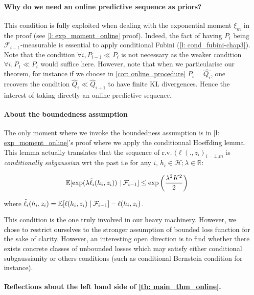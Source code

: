 \paragraph{Why do we need an online predictive sequence as priors? }

This condition is fully exploited when dealing with the exponential moment $\xi_m$ in the proof (see \cref{l: exp_moment_online} proof). Indeed, the fact of having $P_i$ being $\mathcal{F}_{i-1}$-measurable is essential to apply conditional Fubini (\cref{l: cond_fubini-chap3}). Note that the condition $\forall i , P_{i-1}\ll P_{i}$ is not necessary as the weaker condition $\forall i, P_1 \ll P_i$ would suffice here.
However, note that when we particularise our theorem, for instance if we choose in \cref{cor: online_procedure} $P_i= \hat{Q_i}$, one recovers the condition $\hat{Q}_{i}\ll\hat{Q}_{i+1}$ to have finite KL divergences. Hence the interest of taking directly an online predictive sequence.

\paragraph{About the boundedness assumption}

The only moment where we invoke the boundedness assumption is in \cref{l: exp_moment_online}'s proof where we apply the conditionnal Hoeffding lemma. This lemma actually translates that the sequence of r.v. $(\ell(.,z_i)_{i=1..m}$ is \emph{conditionally subgaussian} wrt the past i.e for any $i$, $h_i\in\mathcal{H}; \lambda\in\mathbb{R}$:

\[ \mathbb{E}[\exp(\lambda \Tilde{\ell}_i(h_i,z_i)) \mid \mathcal{F}_{i-1}] \leq \exp\left( \frac{\lambda^2K^2}{2}\right)\]

 where $\Tilde{\ell}_i(h_i,z_i)= \mathbb{E}[\ell(h_i,z_i)\mid \mathcal{F}_{i-1}]-  \ell(h_i,z_i)$.

 This condition is the one truly involved in our heavy machinery. However, we chose to restrict ourselves to the stronger assumption of bounded loss function for the sake of clarity. However, an interesting open direction is to find whether there exists concrete classes of unbounded losses which may satisfy either conditional subgaussianity or others conditions (such as conditional Bernstein condition for instance).


 \paragraph{Reflections about the left hand side of \cref{th: main_thm_online}.}

